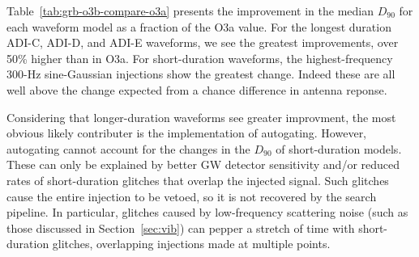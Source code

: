 Table~\ref{tab:grb-o3b-compare-o3a} presents the improvement in the median $D_{90}$ for each waveform model as a fraction of the O3a value.
For the longest duration ADI-C, ADI-D, and ADI-E waveforms, we see the greatest improvements, over 50\% higher than in O3a.
For short-duration waveforms, the highest-frequency 300-Hz sine-Gaussian injections show the greatest change.
Indeed these are all well above the change expected from a chance difference in antenna reponse.

Considering that longer-duration waveforms see greater improvment, the most obvious likely contributer is the implementation of autogating.
However, autogating cannot account for the changes in the $D_{90}$ of short-duration models.
These can only be explained by better GW detector sensitivity and/or reduced rates of short-duration glitches that overlap the injected signal.
Such glitches cause the entire injection to be vetoed, so it is not recovered by the search pipeline.
In particular, glitches caused by low-frequency scattering noise (such as those discussed in Section~\ref{sec:vib}) can pepper a stretch of time with short-duration glitches, overlapping injections made at multiple points.
